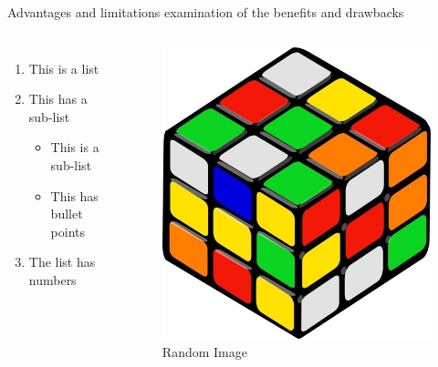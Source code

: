 \begin{frame}{Advantages and limitations}
examination of the benefits and drawbacks 
    \begin{columns}
        \begin{enumerate}
            \item This is a list
            \item This has a sub-list
                \begin{itemize}
                    \item This is a sub-list
                    \item This has bullet points
                \end{itemize}
            \item The list has numbers    
        \end{enumerate}
        \begin{figure}
        \centering
        \includegraphics[scale=0.2]{images/illustrate/illus1.jpg}
        \caption{Random Image}
        \end{figure}
    \end{columns}
\end{frame}